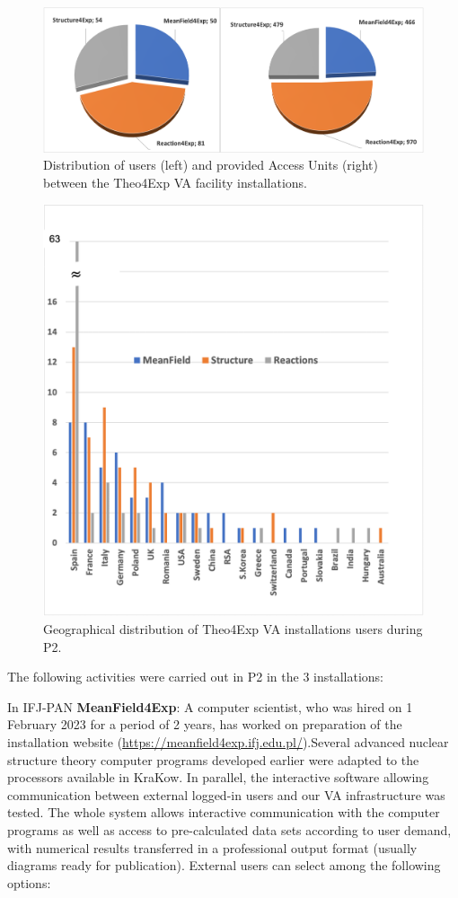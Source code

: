 \begin{figure}[!h]
    \centering
    \includegraphics[width=1.0\linewidth]{graphics/WP2_VA_statistics.png}
    \caption{Distribution of users (left) and provided Access Units (right) between the Theo4Exp VA facility installations.}
    \label{fig:WP2_VA_statistics}
\end{figure}

\begin{figure}[!h]
    \centering
    \includegraphics[width=0.85\linewidth]{graphics/VA_countries.png}
    \caption{Geographical distribution of Theo4Exp VA installations users during P2.}
    \label{fig:VA_countries}
\end{figure}
The following activities were carried out in P2 in the 3 installations:

In IFJ-PAN \textbf{MeanField4Exp}: A computer scientist, who was hired on 1 February 2023 for a period of 2 years, has worked on preparation of the installation website (\url{https://meanfield4exp.ifj.edu.pl/}).Several advanced nuclear structure theory computer programs developed earlier were adapted to the processors available in KraKow. In parallel, the interactive software allowing communication between external logged-in users and our VA infrastructure was tested. The whole system allows interactive communication with the computer programs as well as access to pre-calculated data sets according to user demand, with numerical results transferred in a professional output format (usually diagrams ready for publication). External users can select among the following options:

